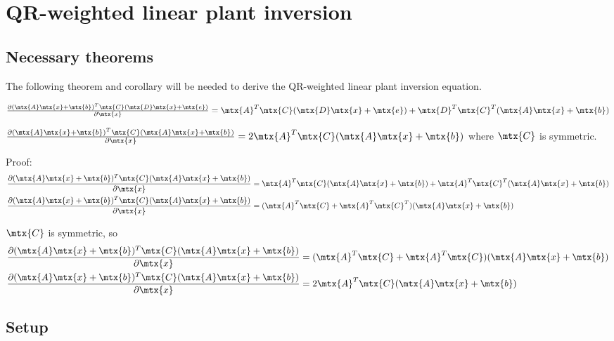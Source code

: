 
\chapter{QR-weighted linear plant inversion}

\section{Necessary theorems}

The following theorem and corollary will be needed to derive the QR-weighted
linear plant inversion equation.
\begin{theorem}
  $\frac{\partial (\mtx{A}\mtx{x} + \mtx{b})^T\mtx{C}
    (\mtx{D}\mtx{x} + \mtx{e})}{\partial\mtx{x}} =
    \mtx{A}^T\mtx{C}(\mtx{D}\mtx{x} + \mtx{e}) + \mtx{D}^T\mtx{C}^T
    (\mtx{A}\mtx{x} + \mtx{b})$
\end{theorem}
\begin{corollary}
  \label{cor:partial_ax_b}

  $\frac{\partial (\mtx{A}\mtx{x} + \mtx{b})^T\mtx{C}
    (\mtx{A}\mtx{x} + \mtx{b})}{\partial\mtx{x}} =
    2\mtx{A}^T\mtx{C}(\mtx{A}\mtx{x} + \mtx{b})$ where $\mtx{C}$ is symmetric.

  Proof:
  \begin{align*}
    \frac{\partial (\mtx{A}\mtx{x} + \mtx{b})^T\mtx{C}
      (\mtx{A}\mtx{x} + \mtx{b})}{\partial\mtx{x}} &=
      \mtx{A}^T\mtx{C}(\mtx{A}\mtx{x} + \mtx{b}) + \mtx{A}^T\mtx{C}^T
      (\mtx{A}\mtx{x} + \mtx{b}) \\
    \frac{\partial (\mtx{A}\mtx{x} + \mtx{b})^T\mtx{C}
      (\mtx{A}\mtx{x} + \mtx{b})}{\partial\mtx{x}} &=
      (\mtx{A}^T\mtx{C} + \mtx{A}^T\mtx{C}^T)(\mtx{A}\mtx{x} + \mtx{b})
  \end{align*}

  $\mtx{C}$ is symmetric, so
  \begin{align*}
    \frac{\partial (\mtx{A}\mtx{x} + \mtx{b})^T\mtx{C}
      (\mtx{A}\mtx{x} + \mtx{b})}{\partial\mtx{x}} &=
      (\mtx{A}^T\mtx{C} + \mtx{A}^T\mtx{C})(\mtx{A}\mtx{x} + \mtx{b}) \\
    \frac{\partial (\mtx{A}\mtx{x} + \mtx{b})^T\mtx{C}
      (\mtx{A}\mtx{x} + \mtx{b})}{\partial\mtx{x}} &=
      2\mtx{A}^T\mtx{C}(\mtx{A}\mtx{x} + \mtx{b})
  \end{align*}
\end{corollary}

\section{Setup}

